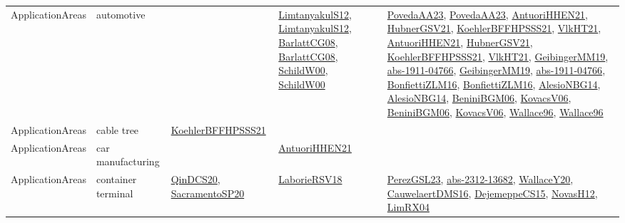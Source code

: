 {\begin{longtable}{llp{6cm}p{6cm}p{6cm}}
ApplicationAreas & automotive &  & \href{articles/LimtanyakulS12.pdf}{LimtanyakulS12}\cite{LimtanyakulS12}, \href{articles/LimtanyakulS12.pdf}{LimtanyakulS12}\cite{LimtanyakulS12}, \href{papers/BarlattCG08.pdf}{BarlattCG08}\cite{BarlattCG08}, \href{papers/BarlattCG08.pdf}{BarlattCG08}\cite{BarlattCG08}, \href{articles/SchildW00.pdf}{SchildW00}\cite{SchildW00}, \href{articles/SchildW00.pdf}{SchildW00}\cite{SchildW00} & \href{papers/PovedaAA23.pdf}{PovedaAA23}\cite{PovedaAA23}, \href{papers/PovedaAA23.pdf}{PovedaAA23}\cite{PovedaAA23}, \href{papers/AntuoriHHEN21.pdf}{AntuoriHHEN21}\cite{AntuoriHHEN21}, \href{articles/HubnerGSV21.pdf}{HubnerGSV21}\cite{HubnerGSV21}, \href{articles/KoehlerBFFHPSSS21.pdf}{KoehlerBFFHPSSS21}\cite{KoehlerBFFHPSSS21}, \href{articles/VlkHT21.pdf}{VlkHT21}\cite{VlkHT21}, \href{papers/AntuoriHHEN21.pdf}{AntuoriHHEN21}\cite{AntuoriHHEN21}, \href{articles/HubnerGSV21.pdf}{HubnerGSV21}\cite{HubnerGSV21}, \href{articles/KoehlerBFFHPSSS21.pdf}{KoehlerBFFHPSSS21}\cite{KoehlerBFFHPSSS21}, \href{articles/VlkHT21.pdf}{VlkHT21}\cite{VlkHT21}, \href{papers/GeibingerMM19.pdf}{GeibingerMM19}\cite{GeibingerMM19}, \href{articles/abs-1911-04766.pdf}{abs-1911-04766}\cite{abs-1911-04766}, \href{papers/GeibingerMM19.pdf}{GeibingerMM19}\cite{GeibingerMM19}, \href{articles/abs-1911-04766.pdf}{abs-1911-04766}\cite{abs-1911-04766}, \href{papers/BonfiettiZLM16.pdf}{BonfiettiZLM16}\cite{BonfiettiZLM16}, \href{papers/BonfiettiZLM16.pdf}{BonfiettiZLM16}\cite{BonfiettiZLM16}, \href{papers/AlesioNBG14.pdf}{AlesioNBG14}\cite{AlesioNBG14}, \href{papers/AlesioNBG14.pdf}{AlesioNBG14}\cite{AlesioNBG14}, \href{papers/BeniniBGM06.pdf}{BeniniBGM06}\cite{BeniniBGM06}, \href{papers/KovacsV06.pdf}{KovacsV06}\cite{KovacsV06}, \href{papers/BeniniBGM06.pdf}{BeniniBGM06}\cite{BeniniBGM06}, \href{papers/KovacsV06.pdf}{KovacsV06}\cite{KovacsV06}, \href{articles/Wallace96.pdf}{Wallace96}\cite{Wallace96}, \href{articles/Wallace96.pdf}{Wallace96}\cite{Wallace96}\\
ApplicationAreas & cable tree & \href{articles/KoehlerBFFHPSSS21.pdf}{KoehlerBFFHPSSS21}\cite{KoehlerBFFHPSSS21} &  & \\
ApplicationAreas & car manufacturing &  & \href{papers/AntuoriHHEN21.pdf}{AntuoriHHEN21}\cite{AntuoriHHEN21} & \\
ApplicationAreas & container terminal & \href{articles/QinDCS20.pdf}{QinDCS20}\cite{QinDCS20}, \href{articles/SacramentoSP20.pdf}{SacramentoSP20}\cite{SacramentoSP20} & \href{articles/LaborieRSV18.pdf}{LaborieRSV18}\cite{LaborieRSV18} & \href{papers/PerezGSL23.pdf}{PerezGSL23}\cite{PerezGSL23}, \href{articles/abs-2312-13682.pdf}{abs-2312-13682}\cite{abs-2312-13682}, \href{articles/WallaceY20.pdf}{WallaceY20}\cite{WallaceY20}, \href{papers/CauwelaertDMS16.pdf}{CauwelaertDMS16}\cite{CauwelaertDMS16}, \href{papers/DejemeppeCS15.pdf}{DejemeppeCS15}\cite{DejemeppeCS15}, \href{articles/NovasH12.pdf}{NovasH12}\cite{NovasH12}, \href{papers/LimRX04.pdf}{LimRX04}\cite{LimRX04}\\

\end{longtable}}

